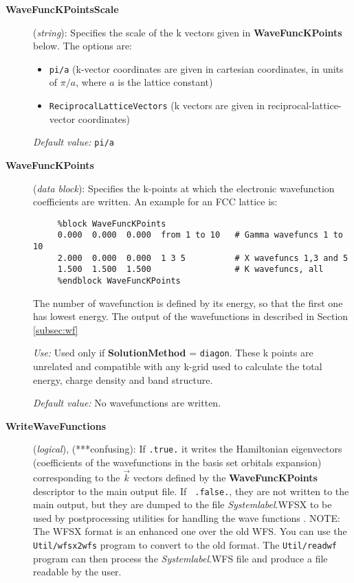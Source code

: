 \documentclass[11pt]{article}
\begin{document}
\begin{description}

\item[{\bf WaveFuncKPointsScale}] ({\it string}): 
Specifies the scale of the k vectors given in 
{\bf WaveFuncKPoints} below.
The options are:
\begin{itemize}
\item {\tt pi/a} (k-vector coordinates are given in cartesian 
coordinates, in units of $\pi/a$, where $a$ is the lattice constant)
\item {\tt ReciprocalLatticeVectors} (k vectors are given in
reciprocal-lattice-vector coordinates)
\end{itemize}

{\it Default value:} {\tt pi/a}


\item[{\bf WaveFuncKPoints}] ({\it data block}): 
Specifies the k-points at which the electronic wavefunction
coefficients are written. 
An example for an FCC lattice is:

\begin{verbatim}
     %block WaveFuncKPoints              
     0.000  0.000  0.000  from 1 to 10   # Gamma wavefuncs 1 to 10
     2.000  0.000  0.000  1 3 5          # X wavefuncs 1,3 and 5
     1.500  1.500  1.500                 # K wavefuncs, all
     %endblock WaveFuncKPoints
\end{verbatim}

The number of wavefunction is defined by its energy, so that the
first one has lowest energy.
The output of the wavefunctions in described in Section \ref{subsec:wf}

{\it Use:} Used only if {\bf SolutionMethod} = {\tt diagon}.
These k points are unrelated and compatible with any k-grid used
to calculate the total energy,  charge density and band structure.

{\it Default value:} No wavefunctions are written.

\item[{\bf WriteWaveFunctions}] ({\it logical}), (***confusing):
   If {\tt .true.} it writes the
  Hamiltonian eigenvectors (coefficients of the wavefunctions in the
  basis set orbitals expansion) corresponding to the $\vec k$ vectors
  defined by the {\bf WaveFuncKPoints}  descriptor to the main output file.  If {\tt
    .false.}, they are not written to the main output, but they are
  dumped to the file {\it Systemlabel}.WFSX to be used by
  postprocessing utilities for handling the wave functions . NOTE: The WFSX format is an enhanced one over the old
  WFS. You can use the {\tt Util/wfsx2wfs} program to convert to the
  old format. The {\tt Util/readwf} program can then
  process the {\it Systemlabel}.WFS file and produce a file readable
  by the user.


\end{description}
\end{document}
